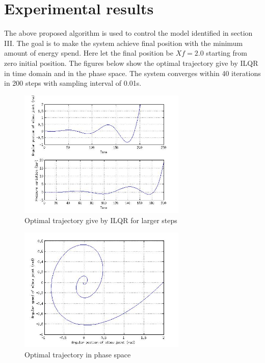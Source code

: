 \documentclass[conference]{IEEEtran}
\begin{document}
\section{Experimental results }
The above proposed algorithm is used to control the model identified in section III. The goal is to make the system achieve  final position with the minimum amount of energy spend.  Here let the final position be $Xf = 2.0$ starting from zero initial position. The figures below show the optimal trajectory give by ILQR in time domain and in the phase space. The system  converges within 40 iterations in 200 steps with sampling interval of 0.01s.
\begin{figure}[ht!]
\centering
\includegraphics[width=80mm]{ilqrresponse2.jpg}
\caption{Optimal trajectory give by ILQR for larger steps\label{Optimal trajectory large}}
\end{figure}

\begin{figure}[ht!]
\centering
\includegraphics[width=80mm]{ilqrphaseresponse2.jpg}
\caption{Optimal trajectory in phase space \label{Optimal trajectory phase space}}
\end{figure}
 
\end{document}

